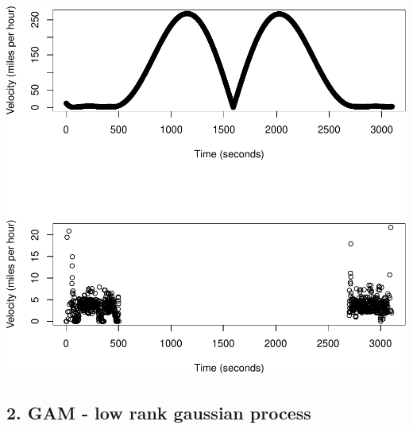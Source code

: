 \documentclass[
]{book}
\begin{document}
\includegraphics{_main_files/figure-latex/unnamed-chunk-7-3.pdf}

\hypertarget{gam---low-rank-gaussian-process}{%
\subsection{2. GAM - low rank gaussian process}\label{gam---low-rank-gaussian-process}}
\end{document}
